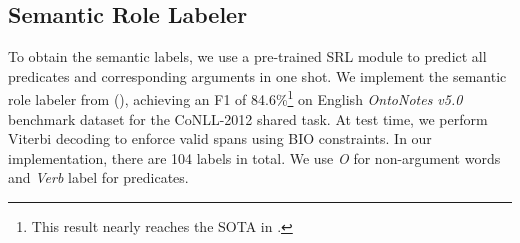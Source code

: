 \documentclass[letterpaper]{article} \usepackage{aaai20}  \usepackage{times}  \usepackage{helvet} \usepackage{courier}  \usepackage[hyphens]{url}  \usepackage{graphicx} \urlstyle{rm} \def\UrlFont{\rm}  \usepackage{graphicx}  \frenchspacing  \usepackage{amssymb}
\begin{document}
\subsection{Semantic Role Labeler}\label{srl}
To obtain the semantic labels, we use a pre-trained SRL module to predict all predicates and corresponding arguments in one shot. We implement the semantic role labeler from \citeauthor{Peters2018ELMO} (\citeyear{Peters2018ELMO}), achieving an F1 of 84.6\%\footnote{This result nearly reaches the SOTA in \cite{He2018Jointly}.} on English \emph{OntoNotes v5.0} benchmark dataset \cite{pradhan2013towards} for the CoNLL-2012 shared task. At test time, we perform Viterbi decoding to enforce valid spans using BIO constraints. In our implementation, there are 104 labels in total. We use \emph{O} for non-argument words and \emph{Verb} label for predicates.
\end{document}
